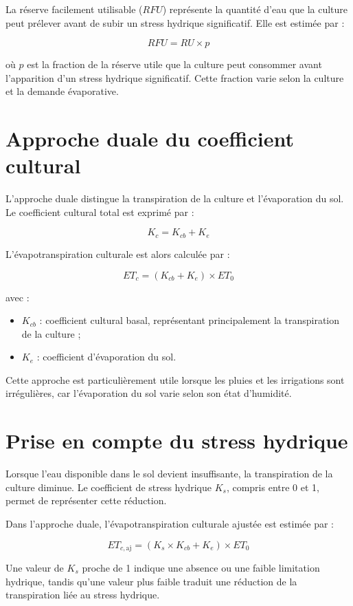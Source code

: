 La réserve facilement utilisable ($RFU$) représente la quantité d'eau que la culture peut prélever avant de subir un stress hydrique significatif. Elle est estimée par :

\begin{equation}
    RFU = RU \times p
    \label{eq:ann_rfu}
\end{equation}

\noindent où $p$ est la fraction de la réserve utile que la culture peut consommer avant l'apparition d'un stress hydrique significatif. Cette fraction varie selon la culture et la demande évaporative.

\section{Approche duale du coefficient cultural}

L'approche duale distingue la transpiration de la culture et l'évaporation du sol. Le coefficient cultural total est exprimé par :

\begin{equation}
    K_c = K_{cb} + K_e
    \label{eq:ann_kc}
\end{equation}

L'évapotranspiration culturale est alors calculée par :

\begin{equation}
    ET_c = (K_{cb} + K_e) \times ET_0
    \label{eq:ann_etc_dual}
\end{equation}

\noindent avec :

\begin{itemize}[label=$\bullet$]
    \item $K_{cb}$ : coefficient cultural basal, représentant principalement la transpiration de la culture ;
    \item $K_e$ : coefficient d'évaporation du sol.
\end{itemize}

Cette approche est particulièrement utile lorsque les pluies et les irrigations sont irrégulières, car l'évaporation du sol varie selon son état d'humidité.

\section{Prise en compte du stress hydrique}

Lorsque l'eau disponible dans le sol devient insuffisante, la transpiration de la culture diminue. Le coefficient de stress hydrique $K_s$, compris entre 0 et 1, permet de représenter cette réduction.

Dans l'approche duale, l'évapotranspiration culturale ajustée est estimée par :

\begin{equation}
    ET_{c,\mathrm{aj}} = (K_s \times K_{cb} + K_e) \times ET_0
    \label{eq:ann_etc_aj}
\end{equation}

Une valeur de $K_s$ proche de 1 indique une absence ou une faible limitation hydrique, tandis qu'une valeur plus faible traduit une réduction de la transpiration liée au stress hydrique.
